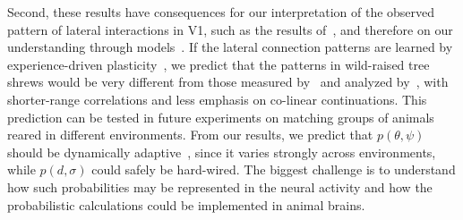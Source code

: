 \documentclass[a4paper]{article}
\begin{document}
Second, these results have consequences for our interpretation of the observed pattern 
of lateral interactions in V1, such as the results of~\textcite{Bosking97},
and therefore on our understanding through models~\autocite{Garrigues08,Bednar12jpp}. 
If the lateral connection patterns are learned by experience-driven plasticity~\autocite{Callaway90}, 
we predict that the patterns in wild-raised tree shrews would be very different 
from those measured by~\textcite{Bosking97} and analyzed by~\textcite{Hunt11}, 
with shorter-range correlations and less emphasis on co-linear continuations. 
This prediction can be tested in future experiments on matching groups 
of animals reared in different environments. 
From our results, we predict that $p(\theta, \psi)$ should be dynamically adaptive~\autocite{McManus11}, 
since it varies strongly across environments, while $p(d,\sigma)$ could safely be hard-wired. 
The biggest challenge is to understand how such probabilities 
may be represented in the neural activity and how the probabilistic calculations 
could be implemented in animal brains. 
\printbibliography
\end{document}
